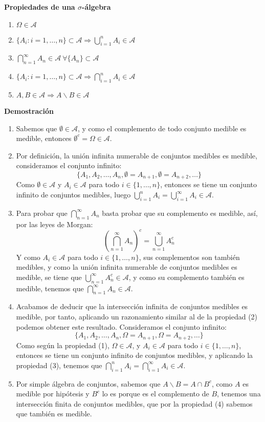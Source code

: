 \documentclass{article}
\begin{document}
\textbf{Propiedades de una $\sigma$-álgebra}
\begin{enumerate}
    \item $\Omega\in\mathcal{A}$
    \item $\{A_i:i=1,\dots,n\}\subset\mathcal{A}\Rightarrow\bigcup_{i=1}^n A_i\in\mathcal{A} $
    \item $\bigcap_{n=1}^\infty A_n\in \mathcal{A} \ \forall\{A_n\}\subset\mathcal{A}$
    \item $\{A_i:i=1,\dots,n\}\subset\mathcal{A}\Rightarrow\bigcap_{i=1}^n A_i\in\mathcal{A} $
    \item $A,B\in\mathcal{A}\Rightarrow A\backslash B\in\mathcal{A}$
\end{enumerate}

\textbf{Demostración}

\begin{enumerate}
    \item Sabemos que $\emptyset\in\mathcal{A}$, y como el complemento de todo conjunto medible es medible, entonces $\emptyset^c=\Omega\in\mathcal{A}$.
    \item Por definición, la unión infinita numerable de conjuntos medibles es medible, consideramos el conjunto infinito:
    $$\{A_1,A_2,\dots,A_n,\emptyset=A_{n+1},\emptyset=A_{n+2},\dots\}$$
    Como $\emptyset\in\mathcal{A}$ y $A_i\in\mathcal{A}$ para todo $i\in\{1,\dots,n\}$, entonces se tiene un conjunto infinito de conjuntos medibles, luego $\bigcup_{i=1}^n A_i= \bigcup_{i=1}^\infty A_i\in\mathcal{A}$.
    \item Para probar que $\bigcap_{n=1}^\infty A_n$ basta probar que su complemento es medible, así, por las leyes de Morgan:
    $$\left(\bigcap_{n=1}^\infty A_n\right)^c=\bigcup_{n=1}^\infty A_n^c$$
    Y como $A_i\in\mathcal{A}$ para todo $i\in\{1,\dots,n\}$, sus complementos son también medibles, y como la unión infinita numerable de conjuntos medibles es medible, se tiene que $\bigcup_{n=1}^\infty A_n^c\in\mathcal{A}$, y como su complemento también es medible, tenemos que $\bigcap_{n=1}^\infty A_n\in\mathcal{A}$.
    \item Acabamos de deducir que la intersección infinita de conjuntos medibles es medible, por tanto, aplicando un razonamiento similar al de la propiedad (2) podemos obtener este resultado. Consideramos el conjunto infinito:
    $$\{A_1,A_2,\dots,A_n,\Omega=A_{n+1},\Omega=A_{n+2},\dots\}$$
    Como según la propiedad (1), $\Omega\in\mathcal{A}$, y $A_i\in\mathcal{A}$ para todo $i\in\{1,\dots,n\}$, entonces se tiene un conjunto infinito de conjuntos medibles, y aplicando la propiedad (3), tenemos que $\bigcap_{i=1}^n A_i=\bigcap_{i=1}^\infty A_i\in\mathcal{A}$.
    \item Por simple álgebra de conjuntos, sabemos que $A\backslash B=A\cap B^c$, como $A$ es medible por hipótesis y $B^c$ lo es porque es el complemento de $B$, tenemos una intersección finita de conjuntos medibles, que por la propiedad (4) sabemos que también es medible.
    
\end{enumerate}
\end{document}
